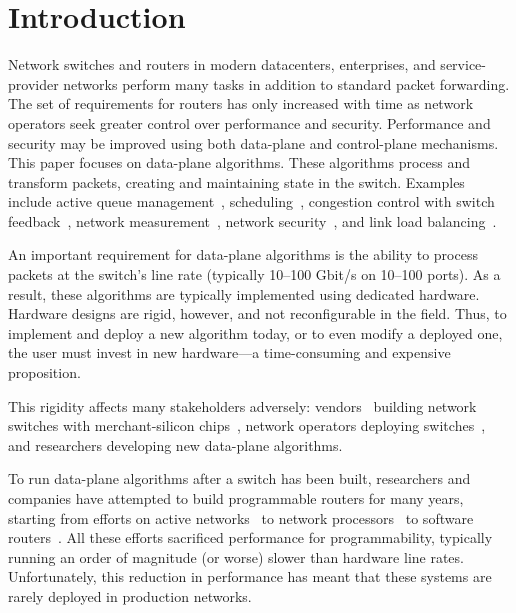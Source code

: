 \section{Introduction}
\label{s:intro}

Network switches and routers in modern datacenters, enterprises, and
service-provider networks perform many tasks in addition to standard packet
forwarding. The set of requirements for routers has only increased with time as
network operators seek greater control over performance and security.
Performance and security may be improved using both data-plane and
control-plane mechanisms. This paper focuses on data-plane algorithms. These
algorithms process and transform packets, creating and maintaining state in the
switch. Examples include active queue management~\cite{red,avq,codel},
scheduling~\cite{pifo_hotnets}, congestion control with switch
feedback~\cite{xcp, rcp, dctcp}, network measurement~\cite{opensketch,
bitmap_george}, network security~\cite{dns_change}, and link load
balancing~\cite{conga}.

An important requirement for data-plane algorithms is the ability to
process packets at the switch's line rate (typically 10--100 Gbit/s on
10--100 ports).  As a result, these
algorithms are typically implemented using dedicated
hardware. Hardware designs are rigid, however, and not reconfigurable
in the field. Thus, to implement and deploy a new algorithm today, or
to even modify a deployed one, the user must invest in new
hardware---a time-consuming and expensive proposition.

This rigidity affects many stakeholders adversely:
vendors~\cite{cisco_nexus, dell_force10, arista_7050} building network
switches with merchant-silicon chips~\cite{trident, tomahawk,
  mellanox}, network operators deploying
switches~\cite{google,facebook,vl2}, and researchers developing new
data-plane algorithms.

To run data-plane algorithms after a switch has been built,
researchers and companies have attempted to build programmable routers
for many years, starting from efforts on active
networks~\cite{active-nets} to network processors~\cite{ixp4xx} to
software routers~\cite{click, dpdk}. All these efforts
sacrificed performance for programmability, typically running an order
of magnitude (or worse) slower than hardware line
rates. Unfortunately, this reduction in performance has meant that
these systems are rarely deployed in production networks.

